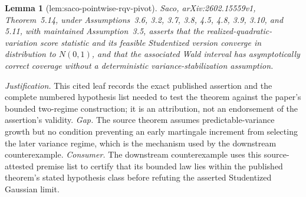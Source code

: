 \documentclass{article}
\newtheorem{lemma}{Lemma}
\begin{document}
\begin{lemma}[lem:saco-pointwise-rqv-pivot]\label{lem:saco-pointwise-rqv-pivot}
Saco, arXiv:2602.15559v1, Theorem~5.14, under Assumptions~3.6, 3.2, 3.7, 3.8, 4.5, 4.8, 3.9, 3.10, and 5.11, with maintained Assumption~3.5, asserts that the realized-quadratic-variation score statistic and its feasible Studentized version converge in distribution to \(N(0,1)\), and that the associated Wald interval has asymptotically correct coverage without a deterministic variance-stabilization assumption.
\end{lemma}
\par\smallskip\noindent \textit{Justification.} This cited leaf records the exact published assertion and the complete numbered hypothesis list needed to test the theorem against the paper's bounded two-regime construction; it is an attribution, not an endorsement of the assertion's validity. \textit{Gap.} The source theorem assumes predictable-variance growth but no condition preventing an early martingale increment from selecting the later variance regime, which is the mechanism used by the downstream counterexample. \textit{Consumer.} The downstream counterexample uses this source-attested premise list to certify that its bounded law lies within the published theorem's stated hypothesis class before refuting the asserted Studentized Gaussian limit.
\end{document}
